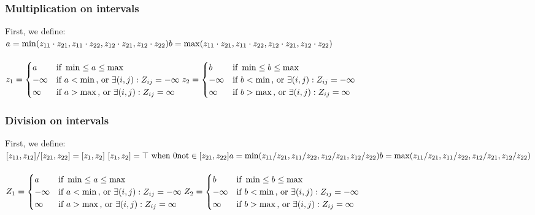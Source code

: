 \subsubsection{Multiplication on intervals}
First, we define:\\
$
a = \min(z_{11} \cdot z_{21}, z_{11} \cdot z_{22}, z_{12} \cdot z_{21}, z_{12} \cdot z_{22})\\
b = \max(z_{11} \cdot z_{21}, z_{11} \cdot z_{22}, z_{12} \cdot z_{21}, z_{12} \cdot z_{22})\\
$\\\\
$z_1 =
     \begin{cases} 
        a       & \text{if } \min \leq a \leq \max \\
        -\infty & \text{if } a < \min \text{, or } \exists (i,j) : {Z_{ij} = -\infty} \\
        \infty & \text{if } a > \max \text{, or } \exists (i,j) : {Z_{ij} = \infty} \\
     \end{cases}\\
z_2 =
     \begin{cases} 
        b       & \text{if } \min \leq b \leq \max \\
        -\infty & \text{if } b < \min \text{, or } \exists (i,j) : {Z_{ij} = -\infty} \\
        \infty & \text{if } b > \max \text{, or } \exists (i,j) : {Z_{ij} = \infty} \\
     \end{cases}
$
\subsubsection{Division on intervals}
First, we define:\\
$
[z_{11}, z_{12}] / [z_{21}, z_{22}] = [z_{1}, z_{2}]\
[z_{1}, z_{2}] = \top \text{ when } 0 \text{not} \in [z_{21}, z_{22}]\\
a = \min(z_{11} / z_{21}, z_{11} / z_{22}, z_{12} / z_{21}, z_{12} / z_{22})\\
b = \max(z_{11} / z_{21}, z_{11} / z_{22}, z_{12} / z_{21}, z_{12} / z_{22})\\
$\\\\
$Z_1 =
     \begin{cases} 
        a       & \text{if } \min \leq a \leq \max \\
        -\infty & \text{if } a < \min \text{, or } \exists (i,j) : {Z_{ij} = -\infty} \\
        \infty & \text{if } a > \max \text{, or } \exists (i,j) : {Z_{ij} = \infty} \\
     \end{cases}\\
Z_2 =
     \begin{cases} 
        b       & \text{if } \min \leq b \leq \max \\
        -\infty & \text{if } b < \min \text{, or } \exists (i,j) : {Z_{ij} = -\infty} \\
        \infty & \text{if } b > \max \text{, or } \exists (i,j) : {Z_{ij} = \infty} \\
     \end{cases}
$

